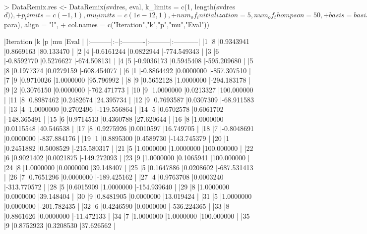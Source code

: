 \documentclass{article}
\begin{document}
\begin{Schunk}
\begin{Sinput}
> DataRemix.res <- DataRemix(svdres, eval, k_limits = c(1, length(svdres$d)), 
+                  p_limits = c(-1,1), mu_limits = c(1e-12,1), 
+                  num_of_initialization = 5, num_of_thompson = 50, 
+                  basis = basis_short, xi = 0.1, full = T, verbose = F, 
+                  X = X, penalty = 100)
> knitr::kable(cbind(1:55,DataRemix.res$para), align = "l", 
+              col.names = c("Iteration","k","p","mu","Eval"))
\end{Sinput}
\begin{Soutput}
|Iteration |k  |p          |mu        |Eval        |
|:---------|:--|:----------|:---------|:-----------|
|1         |8  |0.9343941  |0.8669163 |80.133470   |
|2         |4  |-0.6161244 |0.0822944 |-774.549343 |
|3         |6  |-0.8592770 |0.5276627 |-674.508131 |
|4         |5  |-0.9036173 |0.5945408 |-595.209680 |
|5         |8  |0.1977374  |0.0279159 |-608.454077 |
|6         |1  |-0.8864492 |0.0000000 |-857.307510 |
|7         |9  |0.9710026  |1.0000000 |95.796992   |
|8         |9  |0.5652128  |1.0000000 |-294.183178 |
|9         |2  |0.3076150  |0.0000000 |-762.471773 |
|10        |9  |1.0000000  |0.0213327 |100.000000  |
|11        |8  |0.8987462  |0.2482674 |24.395734   |
|12        |9  |0.7693587  |0.0307309 |-68.911583  |
|13        |4  |1.0000000  |0.2702496 |-119.556864 |
|14        |5  |0.6702578  |0.6061702 |-148.365491 |
|15        |6  |0.9714513  |0.4360788 |27.620644   |
|16        |8  |1.0000000  |0.0115548 |40.546538   |
|17        |8  |0.9275926  |0.0010597 |16.749705   |
|18        |7  |-0.8048691 |0.0000000 |-837.884176 |
|19        |1  |0.8895300  |0.4589730 |-143.745379 |
|20        |1  |0.2451882  |0.5008529 |-215.580317 |
|21        |5  |1.0000000  |1.0000000 |100.000000  |
|22        |6  |0.9021402  |0.0021875 |-149.272093 |
|23        |9  |1.0000000  |0.1065941 |100.000000  |
|24        |8  |1.0000000  |0.0000000 |39.148407   |
|25        |5  |0.1647886  |0.0208602 |-687.531413 |
|26        |7  |0.7651296  |0.0000000 |-189.425162 |
|27        |4  |0.9763708  |0.0003240 |-313.770572 |
|28        |5  |0.6015909  |1.0000000 |-154.939640 |
|29        |8  |1.0000000  |0.0000000 |39.148404   |
|30        |9  |0.8481905  |0.0000000 |13.019424   |
|31        |5  |1.0000000  |0.0000000 |-201.782435 |
|32        |6  |0.4246590  |0.0000000 |-536.224365 |
|33        |8  |0.8861626  |0.0000000 |-11.472133  |
|34        |7  |1.0000000  |1.0000000 |100.000000  |
|35        |9  |0.8752923  |0.3208530 |37.626562   |

\end{Soutput}
\end{Schunk}
\end{document}
